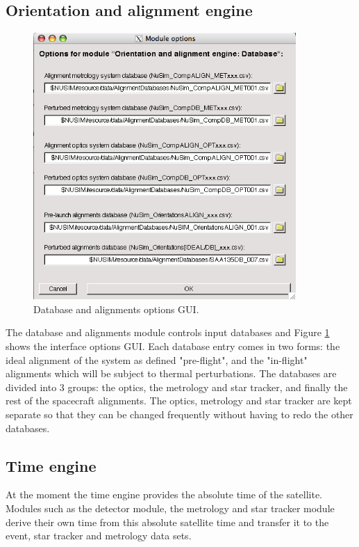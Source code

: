 \subsection{Orientation and alignment engine}
\begin{figure}[tb]
\begin{center}
\includegraphics[width=10cm]{images/DBgui.png}  
\caption{Database and alignments options GUI.}
\label{dbgui} 
\end{center}
\end{figure}

The database and alignments module controls input databases and Figure \ref{dbgui} shows the interface options GUI. Each database entry comes in two forms: the ideal alignment of the system as defined "pre-flight", and the "in-flight" alignments which will be subject to thermal perturbations. The databases are divided into 3 groups: the optics, the metrology and star tracker, and finally the rest of the spacecraft alignments. The optics, metrology and star tracker are kept separate so that they can be changed frequently without having to redo the other databases.

\subsection{Time engine}
At the moment the time engine provides the absolute time of the satellite. Modules such as the detector module, the metrology and star tracker module derive their own time from this absolute satellite time and transfer it to the event, star tracker and metrology data sets.   

